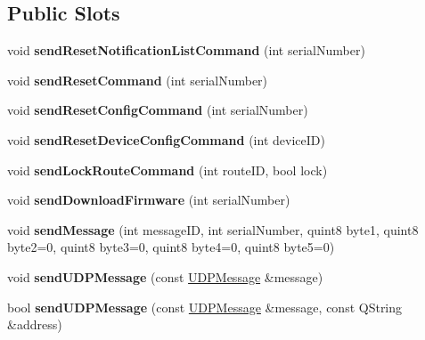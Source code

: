 \subsection*{Public Slots}
\begin{DoxyCompactItemize}
\item 
\mbox{\label{class_message_broadcaster_a32dd162386ef2cf4414b7002d71ab660}} 
void {\bfseries send\+Reset\+Notification\+List\+Command} (int serial\+Number)
\item 
\mbox{\label{class_message_broadcaster_a84f20dff37d73c00f739de7f9e73c178}} 
void {\bfseries send\+Reset\+Command} (int serial\+Number)
\item 
\mbox{\label{class_message_broadcaster_ac18353484a67721b95ec1ea80f247549}} 
void {\bfseries send\+Reset\+Config\+Command} (int serial\+Number)
\item 
\mbox{\label{class_message_broadcaster_a2a6cfe9e14ba853d287b15d140ba31ce}} 
void {\bfseries send\+Reset\+Device\+Config\+Command} (int device\+ID)
\item 
\mbox{\label{class_message_broadcaster_ac58cc1d5b6bd1211079cb74154cd2f0a}} 
void {\bfseries send\+Lock\+Route\+Command} (int route\+ID, bool lock)
\item 
\mbox{\label{class_message_broadcaster_ad5aaa609256cb4d94f966069d16ddcc0}} 
void {\bfseries send\+Download\+Firmware} (int serial\+Number)
\item 
\mbox{\label{class_message_broadcaster_a74aecd50e19ec44b1f594845675e4e68}} 
void {\bfseries send\+Message} (int message\+ID, int serial\+Number, quint8 byte1, quint8 byte2=0, quint8 byte3=0, quint8 byte4=0, quint8 byte5=0)
\item 
\mbox{\label{class_message_broadcaster_ad34fa164afe43eea0a114677590d6f01}} 
void {\bfseries send\+U\+D\+P\+Message} (const \hyperlink{class_u_d_p_message}{U\+D\+P\+Message} \&message)
\item 
\mbox{\label{class_message_broadcaster_afe9d5032c449b68d33de82bd5b38d827}} 
bool {\bfseries send\+U\+D\+P\+Message} (const \hyperlink{class_u_d_p_message}{U\+D\+P\+Message} \&message, const Q\+String \&address)
\end{DoxyCompactItemize}

